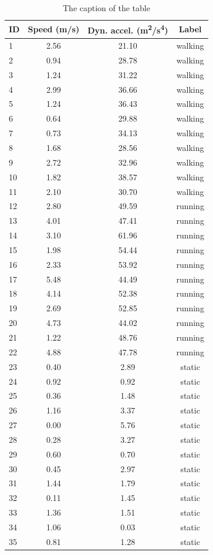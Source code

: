 \begin{table}
\begin{tabular}{lccc}
\hline\noalign{\smallskip}
\textbf{ID} & \textbf{Speed (m/s)} & \textbf{Dyn. accel. (m\textsuperscript{2}/s\textsuperscript{4})} & \textbf{Label}\\
\hline\noalign{\smallskip}
1 & 2.56 & 21.10 & walking\\
2 & 0.94 & 28.78 & walking\\
3 & 1.24 & 31.22 & walking\\
4 & 2.99 & 36.66 & walking\\
5 & 1.24 & 36.43 & walking\\
6 & 0.64 & 29.88 & walking\\
7 & 0.73 & 34.13 & walking\\
8 & 1.68 & 28.56 & walking\\
9 & 2.72 & 32.96 & walking\\
10 & 1.82 & 38.57 & walking\\
11 & 2.10 & 30.70 & walking\\
12 & 2.80 & 49.59 & running\\
13 & 4.01 & 47.41 & running\\
14 & 3.10 & 61.96 & running\\
15 & 1.98 & 54.44 & running\\
16 & 2.33 & 53.92 & running\\
17 & 5.48 & 44.49 & running\\
18 & 4.14 & 52.38 & running\\
19 & 2.69 & 52.85 & running\\
20 & 4.73 & 44.02 & running\\
21 & 1.22 & 48.76 & running\\
22 & 4.88 & 47.78 & running\\
23 & 0.40 & 2.89 & static\\
24 & 0.92 & 0.92 & static\\
25 & 0.36 & 1.48 & static\\
26 & 1.16 & 3.37 & static\\
27 & 0.00 & 5.76 & static\\
28 & 0.28 & 3.27 & static\\
29 & 0.60 & 0.70 & static\\
30 & 0.45 & 2.97 & static\\
31 & 1.44 & 1.79 & static\\
32 & 0.11 & 1.45 & static\\
33 & 1.36 & 1.51 & static\\
34 & 1.06 & 0.03 & static\\
35 & 0.81 & 1.28 & static\\
%
\end{tabular}
\caption{The caption of the table}\label{table:data-from-phone}
\end{table}
